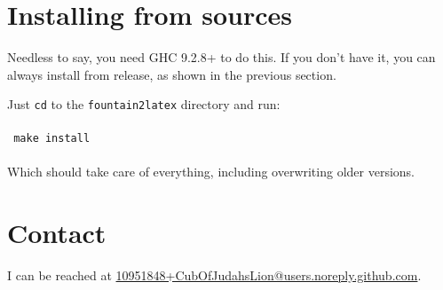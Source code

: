 \documentclass[11pt]{article}
\newcommand{\link}[2]{\textcolor{Blue}{\href{#1}{#2}}}
\begin{document}
\section*{Installing from sources}

Needless to say, you need GHC 9.2.8+ to do this. If you don't have it,
you can always install from release, as shown in the previous section.

Just \texttt{cd} to the \texttt{fountain2latex} directory and run:\\
\\
\texttt{    make install}\\
\\
Which should take care of everything, including overwriting older
versions.


\section*{Contact}

I can be reached at \link{mailto:10951848+CubOfJudahsLion@users.noreply.github.com}{10951848+CubOfJudahsLion@users.noreply.github.com}.
\end{document}
